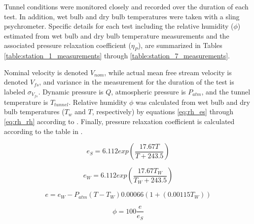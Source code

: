 Tunnel conditions were monitored closely and recorded over the duration of each 
test. In addition, wet bulb and dry bulb temperatures were taken with a sling 
psychrometer. Specific details for each test including the relative humidity 
($\phi$) estimated from wet bulb and dry bulb temperature measurements and the
associated pressure relaxation coefficient 
($\eta_P$), are summarized in Tables \ref{table:station_1_measurements} through 
\ref{table:station_7_measurements}. 

Nominal velocity is denoted $V_{nom}$, while actual mean free stream 
velocity is denoted $V_{fs}$, and variance in the measurement for the 
duration of the test is labeled $\sigma_{V_{fs}}$. Dynamic pressure is $Q$, 
atmospheric 
pressure is $P_{atm}$, and the tunnel temperature is $T_{tunnel}$. Relative 
humidity $\phi$ was calculated from wet bulb and dry bulb temperatures ($T_w$ 
and $T$, respectively) by 
equations \ref{eq:rh_es} through \ref{eq:rh_rh} according to \cite{owen1977}. 
Finally, pressure relaxation coefficient is calculated according to the table 
in \cite{ash2011}.

\begin{equation}
e_S = 6.112 exp \left( \frac{17.67 T}{T + 243.5} \right)
\label{eq:rh_es}
\end{equation}

\begin{equation}
e_W = 6.112 exp \left( \frac{17.67 T_W}{T_W + 243.5} \right)
\label{eq:rh_ew}
\end{equation}

\begin{equation}
e = e_W - P_{atm} (T - T_W) 0.00066(1 +( 0.00115T_W))
\label{eq:rh_e}
\end{equation}

\begin{equation}
\phi = 100 \frac{e}{e_S}
\label{eq:rh_rh}
\end{equation}











